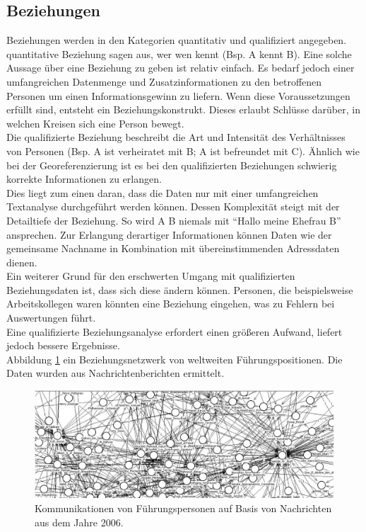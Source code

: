 \documentclass[twoside,a4paper]{article}
\begin{document}
\subsection{Beziehungen}
Beziehungen werden in den Kategorien quantitativ und qualifiziert angegeben.\\
quantitative Beziehung sagen aus, wer wen kennt (Bsp. A kennt B). Eine solche Aussage über eine Beziehung zu geben ist relativ einfach. Es bedarf jedoch einer umfangreichen Datenmenge und Zusatzinformationen zu den betroffenen Personen um einen Informationsgewinn zu liefern. Wenn diese Voraussetzungen erfüllt sind, entsteht ein Beziehungskonstrukt. Dieses erlaubt Schlüsse darüber, in welchen Kreisen sich eine Person bewegt.\\
Die qualifizierte Beziehung beschreibt die Art und Intensität des Verhältnisses von Personen (Bsp. A ist verheiratet mit B; A ist befreundet mit C). Ähnlich wie bei der Georeferenzierung ist es bei den qualifizierten Beziehungen schwierig korrekte Informationen zu erlangen. \\
Dies liegt zum einen daran, dass die Daten nur mit einer umfangreichen Textanalyse durchgeführt werden können. Dessen Komplexität steigt mit der Detailtiefe der Beziehung. So wird A B niemals mit \enquote{Hallo meine Ehefrau B} ansprechen. Zur Erlangung derartiger Informationen können Daten wie der gemeinsame Nachname in Kombination mit übereinstimmenden Adressdaten dienen.\\
Ein weiterer Grund für den erschwerten Umgang mit qualifizierten Beziehungsdaten ist, dass sich diese ändern können. Personen, die beispielsweise Arbeitskollegen waren könnten eine Beziehung eingehen, was zu Fehlern bei Auswertungen führt.\\
Eine qualifizierte Beziehungsanalyse erfordert einen größeren Aufwand, liefert jedoch bessere Ergebnisse.\\
Abbildung \ref{img:Beziehungen} ein Beziehungsnetzwerk von weltweiten Führungspositionen. Die Daten wurden aus Nachrichtenberichten ermittelt.

\begin{figure}[H]
  \centering
  	\includegraphics[width=83.5truemm]{img/Beziehungen}
  \caption{Kommunikationen von Führungspersonen auf Basis von Nachrichten aus dem Jahre 2006.\cite{challanges_in_osint}}
  \label{img:Beziehungen}
\end{figure}
\end{document}
